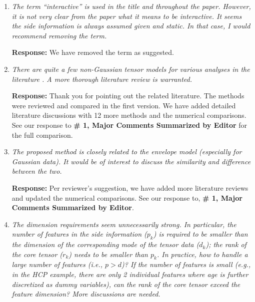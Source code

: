 \documentclass[11pt]{article}
\theoremstyle{plain}
\theoremstyle{definition}
\begin{document}
\begin{enumerate}[wide, labelwidth=!, labelindent=0pt]
    \item \textit{The term “interactive” is used in the title and throughout the paper. However, it is not very clear from the paper what it means to be interactive. It seems the side information is always assumed given and static. In that case, I would recommend removing the term. }
    
    \textbf{Response:} We have removed the term as suggested. 
    
    \item \textit{There are quite a few non-Gaussian tensor models for various analyses in the literature \citep{tarzanagh2019regularized, li2020generalized, chi2012tensors, hong2020generalized}. A more thorough literature review is warranted. }
    
    \textbf{Response:} Thank you for pointing out the related literature. The methods \citep{chi2012tensors, hong2020generalized} were reviewed and compared in the first version. We have added detailed literature discussions with 12 more methods and the numerical comparisons. See our response to \textbf{\# 1, Major Comments Summarized by Editor} for the full comparison.     
        
    \item \textit{The proposed method is closely related to the envelope model (especially for Gaussian data)\citep{li2017parsimonious}. It would be of interest to discuss the similarity and difference between the two.}
    
    \textbf{Response:} Per reviewer's suggestion, we have added more literature reviews and updated the numerical comparisons. See our response to, \textbf{\# 1, Major Comments Summarized by Editor}. 
    
    
    
    \item \textit{The dimension requirements seem unnecessarily strong. In particular, the number of features in the side information ($p_k$) is required to be smaller than the dimension of the corresponding mode of the tensor data ($d_k$); the rank of the core tensor ($r_k$) needs to be smaller than $p_k$. In practice, how to handle a large number of features (i.e., $p > d$)? If the number of features is small (e.g., in the HCP example, there are only 2 individual features where age is further discretized as dummy variables), can the rank of the core tensor exceed the feature dimension? More discussions are needed.}
    

\end{enumerate}
\end{document}
